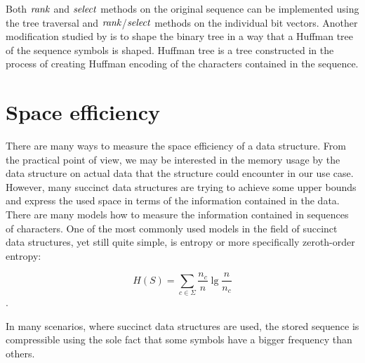 Both $\mathit{rank}$ and $\mathit{select}$ methods on the original sequence can be implemented using the tree
traversal and $\mathit{rank}$/$\mathit{select}$ methods on the individual bit vectors. Another modification
studied by \cite{makinen2005succinct} is to shape the binary tree in a way that a Huffman
tree of the sequence symbols is shaped. Huffman tree is a tree constructed in the
process of creating Huffman encoding of the characters contained in the sequence.

\section{Space efficiency}

There are many ways to measure the space efficiency of a data structure. From the
practical point of view, we may be interested in the memory usage by the data
structure on actual data that the structure could encounter in our use case. However,
many succinct data structures are trying to achieve some upper bounds and express
the used space in terms of the information contained in the data. There are many
models how to measure the information contained in sequences of characters. One
of the most commonly used models in the field of succinct data structures, yet still
quite simple, is entropy or more specifically zeroth-order entropy:

$$H(S)=\sum_{c\in\Sigma} \frac{n_c}{n} \lg \frac{n}{n_c}$$.

In many scenarios, where succinct data structures are used, the stored sequence
is compressible using the sole fact that some symbols have a bigger frequency than others.